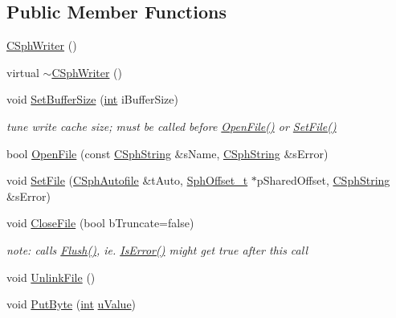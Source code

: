 \subsection*{Public Member Functions}
\begin{DoxyCompactItemize}
\item 
\hyperlink{classCSphWriter_a3a120292f302669da185e9abe6027efe}{C\-Sph\-Writer} ()
\item 
virtual \hyperlink{classCSphWriter_ae9cecc5bc962fb12ae00d5f95c9dfb28}{$\sim$\-C\-Sph\-Writer} ()
\item 
void \hyperlink{classCSphWriter_af3acea52de0e265626e0f69c7de933ea}{Set\-Buffer\-Size} (\hyperlink{sphinxexpr_8cpp_a4a26e8f9cb8b736e0c4cbf4d16de985e}{int} i\-Buffer\-Size)
\begin{DoxyCompactList}\small\item\em tune write cache size; must be called before \hyperlink{classCSphWriter_a458675d2b90b9d61d86b76d382eb5628}{Open\-File()} or \hyperlink{classCSphWriter_a68de8f089ebaa1e21b0f041615caf8e7}{Set\-File()} \end{DoxyCompactList}\item 
bool \hyperlink{classCSphWriter_a458675d2b90b9d61d86b76d382eb5628}{Open\-File} (const \hyperlink{structCSphString}{C\-Sph\-String} \&s\-Name, \hyperlink{structCSphString}{C\-Sph\-String} \&s\-Error)
\item 
void \hyperlink{classCSphWriter_a68de8f089ebaa1e21b0f041615caf8e7}{Set\-File} (\hyperlink{classCSphAutofile}{C\-Sph\-Autofile} \&t\-Auto, \hyperlink{sphinx_8h_a0fb3b64afebef33c61367714754eaa90}{Sph\-Offset\-\_\-t} $\ast$p\-Shared\-Offset, \hyperlink{structCSphString}{C\-Sph\-String} \&s\-Error)
\item 
void \hyperlink{classCSphWriter_a1e6512085b59c707834f4e86781ae3c3}{Close\-File} (bool b\-Truncate=false)
\begin{DoxyCompactList}\small\item\em note\-: calls \hyperlink{classCSphWriter_a1a2e6bfe521039f4eb5453725b5a4162}{Flush()}, ie. \hyperlink{classCSphWriter_a82873454dce55dd4bb1a502f20bd2f69}{Is\-Error()} might get true after this call \end{DoxyCompactList}\item 
void \hyperlink{classCSphWriter_a00359c4f41787abd3c30f97cbe72fb94}{Unlink\-File} ()
\item 
void \hyperlink{classCSphWriter_a8ae85dbc8baefd74a0ea4749db42d33f}{Put\-Byte} (\hyperlink{sphinxexpr_8cpp_a4a26e8f9cb8b736e0c4cbf4d16de985e}{int} \hyperlink{sphinxsort_8cpp_a7906295a5b0753053dbc737117036d06}{u\-Value})

\end{DoxyCompactItemize}
